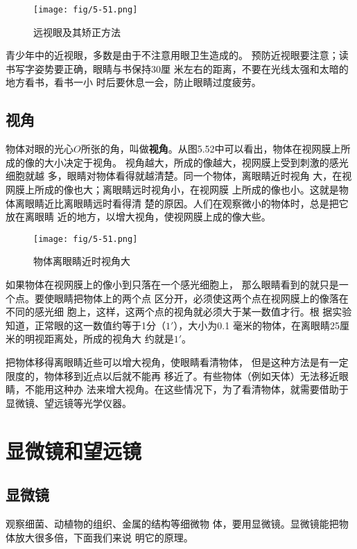     \begin{figure}[htp]\centering
        \texttt{[image: fig/5-51.png]}
        \caption{远视眼及其矫正方法}
        \end{figure}

青少年中的近视眼，多数是由于不注意用眼卫生造成的。
预防近视眼要注意；读书写字姿势要正确，眼睛与书保持30厘
米左右的距离，不要在光线太强和太暗的地方看书，看书一小
时后要休息一会，防止眼睛过度疲劳。

\subsection{视角}

物体对眼的光心$O$所张的角，叫做\textbf{视角}。从图5.52中可以看出，物体在视网膜上所成的像的大小决定于视角。
视角越大，所成的像越大，视网膜上受到刺激的感光细胞就越
多，眼睛对物体看得就越清楚。同一个物体，离眼睛近时视角
大，在视网膜上所成的像也大；离眼睛远时视角小，在视网膜
上所成的像也小。这就是物体离眼睛近比离眼睛远时看得清
楚的原因。人们在观察微小的物体时，总是把它放在离眼睛
近的地方，以增大视角，使视网膜上成的像大些。

\begin{figure}[htp]\centering
    \texttt{[image: fig/5-51.png]}
    \caption{物体离眼睛近时视角大}
    \end{figure}

如果物体在视网膜上的像小到只落在一个感光细胞上，
那么眼睛看到的就只是一个点。要使眼睛把物体上的两个点
区分开，必须使这两个点在视网膜上的像落在不同的感光细
胞上，这样，这两个点的视角就必须大于某一数值才行。根
据实验知道，正常眼的这一数值约等于1分（$1'$），大小为0.1
毫米的物体，在离眼睛25厘米的明视距离处，所成的视角大
约就是$1'$。

把物体移得离眼睛近些可以增大视角，使眼睛看清物体，
但是这种方法是有一定限度的，物体移到近点以后就不能再
移近了。有些物体（例如天体）无法移近眼睛，不能用这种办
法来增大视角。在这些情况下，为了看清物体，就需要借助于
显微镜、望远镜等光学仪器。

\section{显微镜和望远镜}
\subsection{显微镜}

观察细菌、动植物的组织、金属的结构等细微物
体，要用显微镜。显微镜能把物体放大很多倍，下面我们来说
明它的原理。

